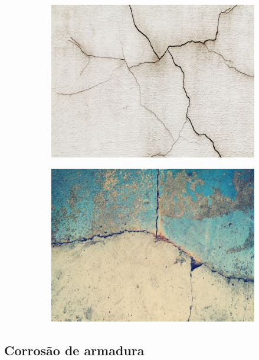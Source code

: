 \begin{figure}[htb]
\centering
\caption{Exemplos de fissuras em estruturas de concreto.}
    \begin{subfigure}{.5\textwidth}
      \centering
      \includegraphics[width=.8\linewidth]{images/mapa_da_obra_img_fissura.jpg}
      \label{fig:fissura01}
    \end{subfigure}%
    \begin{subfigure}{.5\textwidth}
      \centering
      \includegraphics[width=.8\linewidth]{images/tudo_construcao_fissura02.jpg}
      \label{fig:fissura02}
    \end{subfigure}


\label{fig:fissuras}
\end{figure}

\subsection{Corrosão de armadura}

